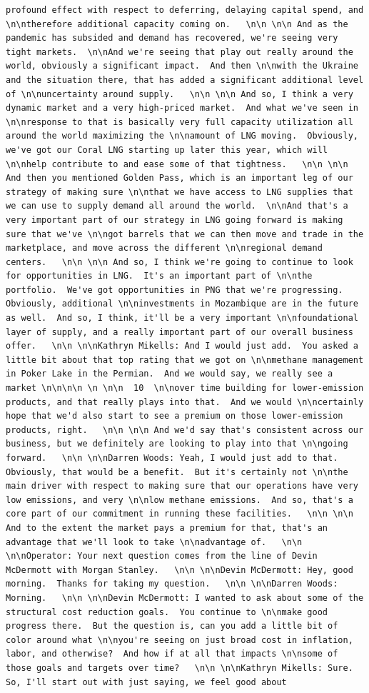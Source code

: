 \documentclass[
  letterpaper,
  DIV=11,
  numbers=noendperiod]{scrreprt}
\begin{document}
\begin{verbatim}
profound effect with respect to deferring, delaying capital spend, and \n\ntherefore additional capacity coming on.   \n\n \n\n And as the pandemic has subsided and demand has recovered, we're seeing very tight markets.  \n\nAnd we're seeing that play out really around the world, obviously a significant impact.  And then \n\nwith the Ukraine and the situation there, that has added a significant additional level of \n\nuncertainty around supply.   \n\n \n\n And so, I think a very dynamic market and a very high-priced market.  And what we've seen in \n\nresponse to that is basically very full capacity utilization all around the world maximizing the \n\namount of LNG moving.  Obviously, we've got our Coral LNG starting up later this year, which will \n\nhelp contribute to and ease some of that tightness.   \n\n \n\n And then you mentioned Golden Pass, which is an important leg of our strategy of making sure \n\nthat we have access to LNG supplies that we can use to supply demand all around the world.  \n\nAnd that's a very important part of our strategy in LNG going forward is making sure that we've \n\ngot barrels that we can then move and trade in the marketplace, and move across the different \n\nregional demand centers.   \n\n \n\n And so, I think we're going to continue to look for opportunities in LNG.  It's an important part of \n\nthe portfolio.  We've got opportunities in PNG that we're progressing.  Obviously, additional \n\ninvestments in Mozambique are in the future as well.  And so, I think, it'll be a very important \n\nfoundational layer of supply, and a really important part of our overall business offer.   \n\n \n\nKathryn Mikells: And I would just add.  You asked a little bit about that top rating that we got on \n\nmethane management in Poker Lake in the Permian.  And we would say, we really see a market \n\n\n\n \n \n\n  10  \n\nover time building for lower-emission products, and that really plays into that.  And we would \n\ncertainly hope that we'd also start to see a premium on those lower-emission products, right.   \n\n \n\n And we'd say that's consistent across our business, but we definitely are looking to play into that \n\ngoing forward.   \n\n \n\nDarren Woods: Yeah, I would just add to that.  Obviously, that would be a benefit.  But it's certainly not \n\nthe main driver with respect to making sure that our operations have very low emissions, and very \n\nlow methane emissions.  And so, that's a core part of our commitment in running these facilities.   \n\n \n\n And to the extent the market pays a premium for that, that's an advantage that we'll look to take \n\nadvantage of.   \n\n \n\nOperator: Your next question comes from the line of Devin McDermott with Morgan Stanley.   \n\n \n\nDevin McDermott: Hey, good morning.  Thanks for taking my question.   \n\n \n\nDarren Woods: Morning.   \n\n \n\nDevin McDermott: I wanted to ask about some of the structural cost reduction goals.  You continue to \n\nmake good progress there.  But the question is, can you add a little bit of color around what \n\nyou're seeing on just broad cost in inflation, labor, and otherwise?  And how if at all that impacts \n\nsome of those goals and targets over time?   \n\n \n\nKathryn Mikells: Sure.  So, I'll start out with just saying, we feel good about 
\end{verbatim}
\end{document}
